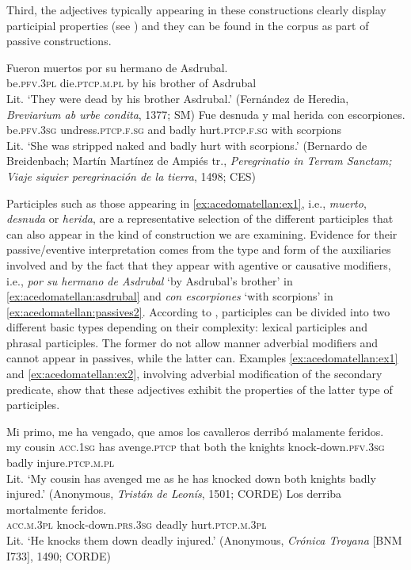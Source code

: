 \documentclass[output=paper,colorlinks,citecolor=brown,
]{langscibook}
\begin{document}
Third,  the adjectives typically appearing in these constructions clearly display participial properties (see \citealt{Bosque1990}) and they can be found in the corpus as part of passive constructions.

\ea\label{ex:acedomatellan:ex1}
  \ea\label{ex:acedomatellan:asdrubal}
    \gll Fueron muertos por	 su 	hermano 	de Asdrubal.\\
be.\textsc{pfv}.\textsc{3pl}	die.\textsc{ptcp}.\textsc{m}.\textsc{pl}				by		his	 	brother 		of Asdrubal\\
    \glt Lit. `They were dead by his brother Asdrubal.' (Fernández de Heredia, \textit{Breviarium ab urbe condita}, 1377; SM) 
  \ex\label{ex:acedomatellan:passives2}
    \gll Fue desnuda y mal 	herida con escorpiones.\\
be.\textsc{pfv}.\textsc{3sg}		undress.\textsc{ptcp}.\textsc{f}.\textsc{sg} and 	badly hurt.\textsc{ptcp}.\textsc{f}.\textsc{sg}	with 	scorpions \\ 
    \glt Lit. `She was stripped naked and badly hurt with scorpions.' (Bernardo de Breidenbach; Martín Martínez de Ampiés tr., \textit{Peregrinatio in Terram Sanctam; Viaje siquier peregrinación de la tierra}, 1498; CES) 
  \z 
\z 

Participles such as those appearing in \ref{ex:acedomatellan:ex1}, i.e., \textit{muerto}, \textit{desnuda} or \textit{herida}, are a representative selection of the different participles that can also appear in the kind of construction we are examining. Evidence for their passive/eventive interpretation comes from the type and form of the auxiliaries involved and by the fact that they appear with agentive or causative modifiers, i.e., \textit{por su hermano de Asdrubal} `by Asdrubal’s brother’ in \ref{ex:acedomatellan:asdrubal} and \textit{con escorpiones} ‘with scorpions’ in \ref{ex:acedomatellan:passives2}. According to \citet{Anagnostopolou2003}, participles can be divided into two different basic types depending on their complexity: lexical participles and phrasal participles. The former do not allow manner adverbial modifiers and cannot appear in passives, while the latter can. Examples \ref{ex:acedomatellan:ex1} and \ref{ex:acedomatellan:ex2}, involving adverbial modification of the secondary predicate, show that these adjectives exhibit the properties of the latter type of participles.  

\ea\label{ex:acedomatellan:ex2}
  \ea
    \gll Mi primo, me ha vengado, que amos los cavalleros derribó malamente feridos.\\
my cousin \textsc{acc}.\textsc{1sg} has avenge.\textsc{ptcp} that both the knights knock-down.\textsc{pfv}.\textsc{3sg} badly injure.\textsc{ptcp}.\textsc{m}.\textsc{pl}\\
    \glt Lit. `My cousin has avenged me as he has knocked down both knights badly injured.'  (Anonymous, \textit{Tristán de Leonís}, 1501; CORDE)
  \ex
    \gll Los derriba mortalmente feridos.\\
\textsc{acc}.\textsc{m}.\textsc{3pl} knock-down.\textsc{prs}.\textsc{3sg} deadly hurt.\textsc{ptcp}.\textsc{m}.\textsc{3pl}\\
    \glt Lit. `He knocks them down deadly injured.' (Anonymous, \textit{Crónica Troyana} [BNM I733], 1490; CORDE)
  \z 
\z 
\end{document}
